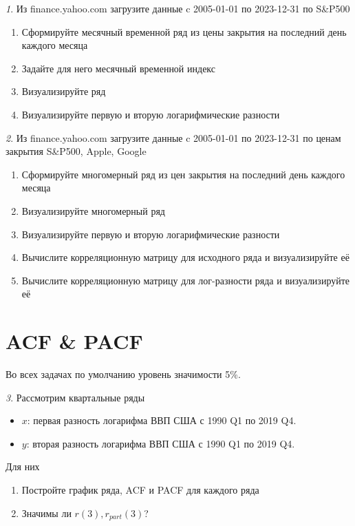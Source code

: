 \documentclass[12pt]{article}
\theoremstyle{remark}
\newtheorem{exercise}{}[subsection]
\begin{document}
\begin{exercise}
Из finance.yahoo.com загрузите данные c 2005-01-01 по 2023-12-31 по S\&P500
\begin{enumerate}
	\item Сформируйте месячный временной ряд из цены закрытия на последний день каждого месяца
	\item Задайте для него месячный временной индекс
	\item Визуализируйте ряд
	\item Визуализируйте первую и вторую логарифмические разности
\end{enumerate}
\end{exercise}

\begin{exercise}
Из finance.yahoo.com загрузите данные c 2005-01-01 по 2023-12-31 по
ценам закрытия S\&P500, Apple, Google
\begin{enumerate}
	\item Сформируйте многомерный ряд из цен закрытия на последний день каждого месяца
	\item Визуализируйте многомерный ряд
	\item Визуализируйте первую и вторую логарифмические разности
	\item Вычислите корреляционную матрицу для исходного ряда и визуализируйте её
	\item Вычислите корреляционную матрицу для лог-разности ряда и визуализируйте её
\end{enumerate}
\end{exercise}

\section{ACF \& PACF}

Во всех задачах по умолчанию уровень значимости 5\%.

\begin{exercise}
Рассмотрим квартальные ряды
\begin{itemize}
	\item \(x\): первая разность логарифма ВВП США с 1990 Q1 по
	2019 Q4.
	\item \(y\): вторая разность логарифма ВВП США с 1990 Q1 по
	2019 Q4.
\end{itemize}
Для них
\begin{enumerate}
	\item Постройте график ряда, ACF и PACF для каждого ряда
	\item Значимы ли \(r(3),r_{part}(3)\)?
\end{enumerate}
\end{exercise}
\end{document}
